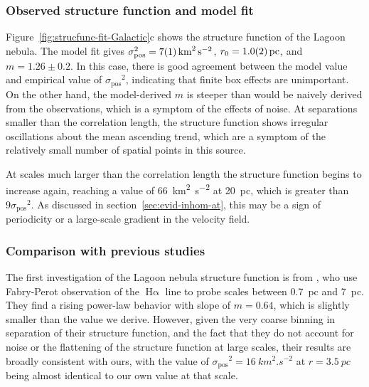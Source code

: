 \documentclass[fleqn,usenatbib, useAMS, a4paper]{mnras}
\newcommand\startNEW{\color{NEWcolor}}
\newcommand\stopNEW{\color{black}}
\newcommand\pos{\ensuremath{_{\mathrm{pos}}}}
\newcommand\ha{\ensuremath{\text{H}\upalpha}}
\begin{document}
\startNEW
\subsubsection{Observed structure function and model fit}
\label{sec:observ-struct-funct-lagoon}

Figure~\ref{fig:strucfunc-fit-Galactic}c shows the structure function of the Lagoon nebula.
The model fit gives \(\sigma\pos^2 = \SI{7 \pm 1}{km^{2}.s^{-2}}\), \(r_0 = \SI{1 \pm 0.2}{pc} \), and \(m = 1.26 \pm 0.2\).
In this case, there is good agreement between the model value and empirical value of \(\sigma\pos^2\),
indicating that finite box effects are unimportant.
On the other hand, the model-derived \(m\) is steeper than would be naively derived
from the observations, which is a symptom of the effects  of noise.
At separations smaller than the correlation length, the structure function shows irregular oscillations about the mean ascending trend,
which are a symptom of the relatively small number of spatial points in this source.

At scales much larger than the correlation length
the structure function begins to increase again, reaching a value of \SI{66}{km^{2}.s^{-2}} at \SI{20}{pc},
which is greater than \(9 \sigma\pos^2\).
As discussed in section~\ref{sec:evid-inhom-at}, this may be a sign of periodicity
or a large-scale gradient in the velocity field.
\stopNEW

\startNEW
\subsubsection{Comparison with previous studies}
\label{sec:comparison-lagoon}
The first investigation of the Lagoon nebula structure function is from \citet{1970A&A.....8..486L},
who use Fabry-Perot observation of the \ha{} line to probe scales
between \SI{0.7}{pc} and \SI{7}{pc}.
They find a rising power-law behavior with slope of \(m = 0.64\),
which is slightly smaller than the value we derive.
However, given the very coarse binning in separation of their structure function,
and the fact that they do not account for noise or the flattening of the structure function at large scales,
their results are broadly consistent with ours,
with the value of \( \sigma\pos^2 = \SI{16}{km^{2}.s^{-2}}\) at \(r = \SI{3.5}{pc}\) being almost
identical to our own value at that scale.
\end{document}
